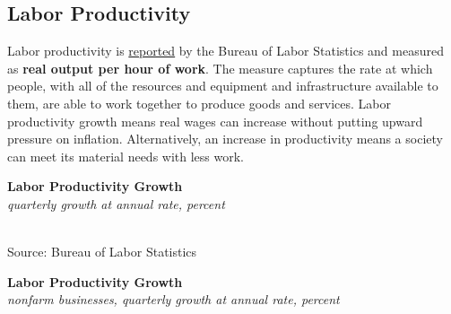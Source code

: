 \documentclass{report}
\makeatletter
\newcommand{\tbllink}[1]{\href{https://raw.githubusercontent.com/bdecon/US-chartbook/master/chartbook/data/#1}{\faTable}}
\newcommand*\short[1]{\expandafter\@gobbletwo\number\numexpr#1\relax}
\newcommand{\absnode}[3]{\node[below right, align=left] at (axis cs: #1,#2) {#3};}
\newcommand{\shdateaxisticks}{
		date coordinates in=x, axis line style={draw=none},
		xmax={2023-02-15},
		max space between ticks=40,	    
		xtick={{1990-01-01}, {1995-01-01}, {2000-01-01}, 
			{2005-01-01}, {2010-01-01}, {2015-01-01}, {2020-01-01}},
		minor xtick={},
		enlarge y limits={0.06}, enlarge x limits={0.01},
		}
\newcommand{\bbar}[2]{extra #1 ticks = {{#2}}, extra #1 tick labels = ,
		extra #1 tick style = {grid=major, grid style={thick, black!25}},}
\newcommand{\stdline}[4]{\addplot[very thick, no markers, color=#1] 
		table [x=#2, y=#3, col sep=comma] {#4};	}
\newcommand{\thickline}[4]{\addplot[ultra thick, no markers, color=#1] 
		table [x=#2, y=#3, col sep=comma] {#4};	}
\newcommand{\rbars}{
		\fill[color=black!10] (axis cs:{1990-07-01},\pgfkeysvalueof{/pgfplots/ymin}) rectangle 
			(axis cs:{1991-03-01}, \pgfkeysvalueof{/pgfplots/ymax});
		\fill[color=black!10] (axis cs:{2007-12-01},\pgfkeysvalueof{/pgfplots/ymin}) rectangle 
			(axis cs:{2009-07-01}, \pgfkeysvalueof{/pgfplots/ymax});
		\fill[color=black!10] (axis cs:{2001-03-01},\pgfkeysvalueof{/pgfplots/ymin}) rectangle 
			(axis cs:{2001-11-01}, \pgfkeysvalueof{/pgfplots/ymax});
		\fill[color=black!10] (axis cs:{2020-02-01},\pgfkeysvalueof{/pgfplots/ymin}) rectangle 
			(axis cs:{2020-05-01}, \pgfkeysvalueof{/pgfplots/ymax});}
\makeatother
\begin{document}
{\begin{minipage}{0.76\textwidth}
\subsection*{Labor Productivity}
\hypertarget{labprod}{}
\small Labor productivity is \href{https://www.bls.gov/news.release/prod2.nr0.htm}{reported} by the Bureau of Labor Statistics and measured as \textbf{real output per hour of work}. The measure captures the rate at which people, with all of the resources and equipment and infrastructure available to them, are able to work together to produce goods and services. Labor productivity growth means real wages can increase without putting upward pressure on inflation. Alternatively, an increase in productivity means a society can meet its material needs with less work.
\vspace{1mm}

\begin{minipage}{0.39\textwidth}
\small 
\end{minipage} \hfill \begin{minipage}{0.54\textwidth}
\normalsize \textbf{Labor Productivity Growth}\\
\footnotesize{\textit{quarterly growth at annual rate, percent}}\\
\hspace*{-2mm} \\
\footnotesize{Source: Bureau of Labor Statistics} \hfill \tbllink{prod_st_lt.csv}
\end{minipage} 
\vspace{1mm}


\vspace{1.0mm}

\normalsize \textbf{Labor Productivity Growth}\\
\footnotesize{\textit{nonfarm businesses, quarterly growth at annual rate, percent}}
\vspace{2.6cm}


\end{minipage}}
\end{document}
